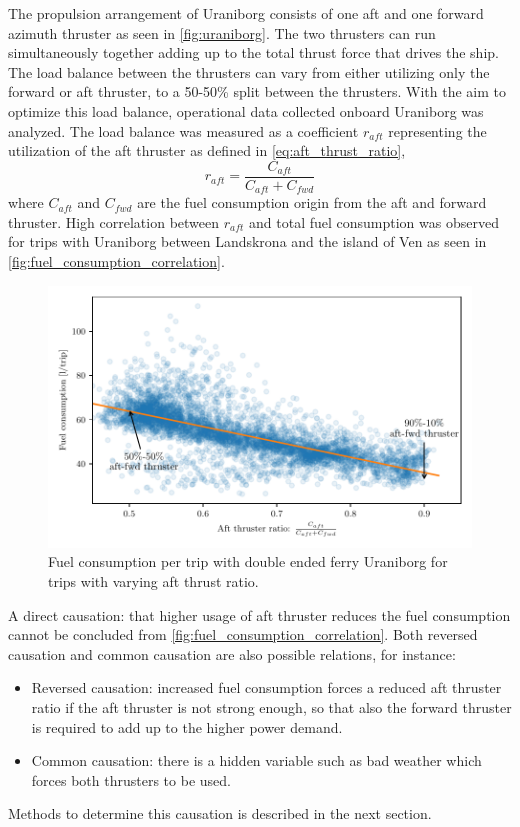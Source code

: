 \documentclass[fleqn,10pt]{olplainarticle}
\begin{document}
The propulsion arrangement of Uraniborg consists of one aft and one forward azimuth thruster as seen in \autoref{fig:uraniborg}. The two thrusters can run simultaneously together adding up to the total thrust force that drives the ship. The load balance between the thrusters can vary from either utilizing only the forward or aft thruster, to a 50-50\% split between the thrusters. With the aim to optimize this load balance, operational data collected onboard Uraniborg was analyzed. 
The load balance was measured as a coefficient $r_{aft}$ representing the utilization of the aft thruster as defined in \autoref{eq:aft_thrust_ratio},
\begin{equation}
    r_{aft} = \frac{C_{aft}}{C_{aft} + C_{fwd}}
    \label{eq:aft_thrust_ratio}
\end{equation}
where $C_{aft}$ and $C_{fwd}$ are the fuel consumption origin from the aft and forward thruster.
High correlation between $r_{aft}$ and total fuel consumption was observed for trips with Uraniborg between Landskrona and the island of Ven as seen in \autoref{fig:fuel_consumption_correlation}.
\begin{figure}[!htb]
    \centering
    \includegraphics[width=\textwidth]{figures/correlation.pdf}
    \caption{Fuel consumption per trip with double ended ferry Uraniborg for trips with varying aft thrust ratio.}
    \label{fig:fuel_consumption_correlation}
\end{figure}

\noindent A direct causation: that higher usage of aft thruster reduces the fuel consumption cannot be concluded from \autoref{fig:fuel_consumption_correlation}. Both reversed causation and common causation are also possible relations, for instance:
\begin{itemize}
    \item Reversed causation: increased fuel consumption forces a reduced aft thruster ratio if the aft thruster is not strong enough, so that also the forward thruster is required to add up to the higher power demand.
    
    \item Common causation: there is a hidden variable such as bad weather which forces both thrusters to be used.
\end{itemize}
Methods to determine this causation is described in the next section. 
\end{document}
